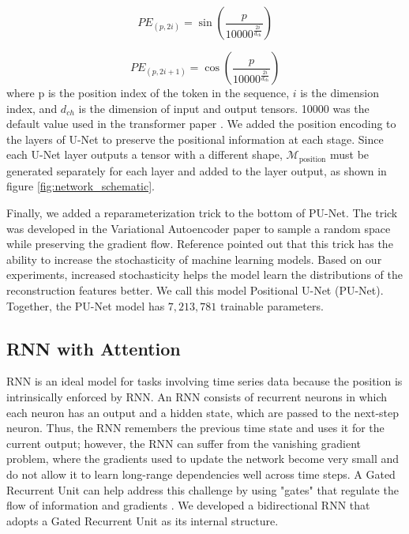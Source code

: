\begin{equation}
PE_{(p, 2i)} = \sin\left(\frac{p}{10000^{\frac{2i}{d_{\text{ch}}}}}\right)
\label{eqn:positional_encoding_sin}
\end{equation}

\begin{equation}
PE_{(p, 2i+1)} = \cos\left(\frac{p}{10000^{\frac{2i}{d_{\text{ch}}}}}\right)
\label{eqn:positional_encoding_cos}
\end{equation}
where p is the position index of the token in the sequence, $i$ is the dimension index, and $d_{ch}$ is the dimension of input and output tensors. 10000 was the default value used in the transformer paper \cite{Transformer}. We added the position encoding to the layers of U-Net to preserve the positional information at each stage. Since each U-Net layer outputs a tensor with a different shape, $\mathcal{M}_{\mathrm{position}}$ must be generated separately for each layer and added to the layer output, as shown in figure \ref{fig:network_schematic}.

Finally, we added a reparameterization trick to the bottom of PU-Net. The trick was developed in the Variational Autoencoder paper \cite{VAE} to sample a random space while preserving the gradient flow. Reference \cite{AAE} pointed out that this trick has the ability to increase the stochasticity of machine learning models. Based on our experiments, increased stochasticity helps the model learn the distributions of the reconstruction features better. We call this model Positional U-Net (PU-Net). Together, the PU-Net model has $7,213,781$ trainable parameters.

\subsection{RNN with Attention} \label{subapp:RNN}
RNN is an ideal model for tasks involving time series data because the position is intrinsically enforced by RNN. \cite{Rumelhart1986} An RNN consists of recurrent neurons in which each neuron has an output and a hidden state, which are passed to the next-step neuron. Thus, the RNN remembers the previous time state and uses it for the current output; however, the RNN can suffer from the vanishing gradient problem, where the gradients used to update the network become very small and do not allow it to learn long-range dependencies well across time steps. A Gated Recurrent Unit can help address this challenge by using "gates" that regulate the flow of information and gradients \cite{GRU}. We developed a bidirectional RNN that adopts a Gated Recurrent Unit \cite{GRU} as its internal structure.

